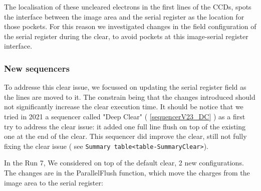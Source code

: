 The localisation of these uncleared electrons in the first lines of the
CCDs, spots the interface between the image area and the serial register
as the location for those pockets. For this reason we investigated
changes in the field configuration of the serial register during the
clear, to avoid pockets at this image-serial register interface.

\subsubsection{New sequencers}\label{new-sequencers}

To addresse this clear issue, we focussed on updating the serial
register field as the lines are moved to it. The constrain being that
the changes introduced should not significantly increase the clear
execution time. It should be notice that we tried in 2021 a sequencer
called "Deep Clear" ( \hyperref[sequencerV23_DC]{{[}sequencerV23\_DC{]}}
) as a first try to address the clear issue: it added one full line
flush on top of the existing one at the end of the clear. This sequencer
did improve the clear, still not fully fixing the clear issue ( see
\texttt{Summary\ table\textless{}table-SummaryClear\textgreater{}}).

In the Run 7, We considered on top of the default clear, 2 new
configurations. The changes are in the ParallelFlush function, which
move the charges from the image area to the serial register:

